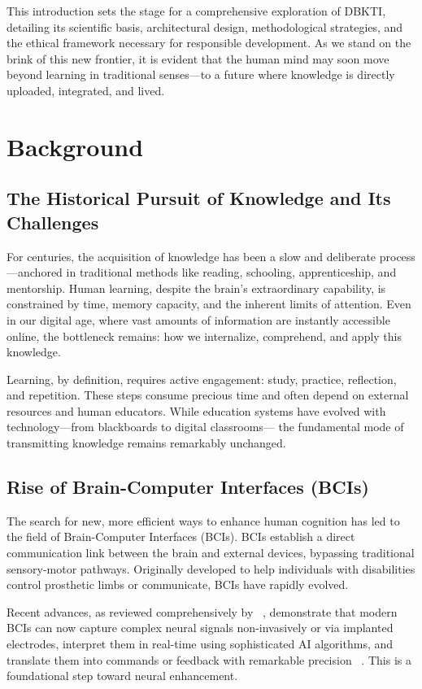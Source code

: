 \documentclass[12pt]{article}
\begin{document}
This introduction sets the stage for a comprehensive exploration of DBKTI, detailing its scientific basis, architectural design, methodological strategies, and the ethical framework necessary for responsible development. As we stand on the brink of this new frontier, it is evident that the human mind may soon move beyond learning in traditional senses—to a future where knowledge is directly uploaded, integrated, and lived.

\section{Background}
\subsection{The Historical Pursuit of Knowledge and Its Challenges}

For centuries, the acquisition of knowledge has been a slow and deliberate process—anchored in traditional methods like reading, schooling, apprenticeship, and mentorship. Human learning, despite the brain’s extraordinary capability, is constrained by time, memory capacity, and the inherent limits of attention. Even in our digital age, where vast amounts of information are instantly accessible online, the bottleneck remains: how we internalize, comprehend, and apply this knowledge.

Learning, by definition, requires active engagement: study, practice, reflection, and repetition. These steps consume precious time and often depend on external resources and human educators. While education systems have evolved with technology—from blackboards to digital classrooms— the fundamental mode of transmitting knowledge remains remarkably unchanged.
\subsection{Rise of Brain-Computer Interfaces (BCIs)}
The search for new, more efficient ways to enhance human cognition has led to the field of Brain-Computer Interfaces (BCIs). BCIs establish a direct communication link between the brain and external devices, bypassing traditional sensory-motor pathways. Originally developed to help individuals with disabilities control prosthetic limbs or communicate, BCIs have rapidly evolved.

Recent advances, as reviewed comprehensively by ~\cite{awuah2024bridgin}, demonstrate that modern BCIs can now capture complex neural signals non-invasively or via implanted electrodes, interpret them in real-time using sophisticated AI algorithms, and translate them into commands or feedback with remarkable precision ~\cite{awuah2024bridgin}. This is a foundational step toward neural enhancement.
\end{document}
